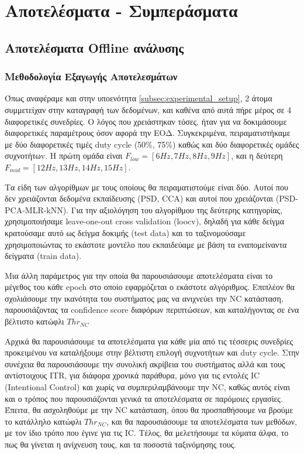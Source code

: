 \documentclass[11pt,a4paper,english,greek,twoside]{../Thesis}
\begin{document}
\chapter{Αποτελέσματα - Συμπεράσματα} \label{chap:Results}

\section{Αποτελέσματα Offline ανάλυσης}

\subsection{Μεθοδολογία Εξαγωγής Αποτελεσμάτων}

\par Όπως αναφέραμε και στην υποενότητα \ref{subsec:experimental_setup}, 2 άτομα συμμετείχαν στην καταγραφή των δεδομένων, και καθένα από αυτά πήρε μέρος σε 4 διαφορετικές συνεδρίες. Ο λόγος που χρειάστηκαν τόσες, ήταν για να δοκιμάσουμε διαφορετικές παραμέτρους όσον αφορά την ΕΟΔ. Συγκεκριμένα, πειραματιστήκαμε με δύο διαφορετικές τιμές duty cycle (50\%, 75\%) καθώς και δύο διαφορετικές ομάδες συχνοτήτωv. Η πρώτη ομάδα είναι $F_{low} = [6Hz,7Hz,8Hz,9Hz]$, και η δεύτερη $F_{mid} = [12Hz,13Hz,14Hz,15Hz]$.

\par Τα είδη των αλγορίθμων με τους οποίους θα πειραματιστούμε είναι δύο. Αυτοί που δεν χρειάζονται δεδομένα εκπαίδευσης (PSD, CCA) και αυτοί που χρειάζονται (PSD-PCA-MLR-kNN). Για την αξιολόγηση του αλγορίθμου της δεύτερης κατηγορίας, χρησιμοποιήσαμε leave-one-out cross validation (loocv), δηλαδή για κάθε δείγμα κρατούσαμε αυτό ως δείγμα δοκιμής (test data) και το ταξινομούσαμε χρησιμοποιώντας το εκάστοτε μοντέλο που εκπαιδεύαμε με βάση τα εναπομείναντα δείγματα (train data).

\par Μια άλλη παράμετρος για την οποία θα παρουσιάσουμε αποτελέσματα είναι το μέγεθος του κάθε epoch στο οποίο εφαρμόζεται ο εκάστοτε αλγόριθμος. Επιπλέον θα σχολιάσουμε την ικανότητα του συστήματος μας να ανιχνεύει την NC κατάσταση, παρουσιάζοντας τα confidence score διαφόρων περιπτώσεων, και καταλήγοντας σε ένα βέλτιστο κατώφλι $Thr_{NC}$

\par Αρχικά θα παρουσιάσουμε τα αποτελέσματα για κάθε μία από τις τέσσερις συνεδρίες προκειμένου να καταλήξουμε στην βέλτιστη επιλογή συχνοτήτων και duty cycle. Στην συνέχεια θα παρουσιάσουμε την συνολική ακρίβεια του συστήματος αλλά και τους αντίστοιχους ITR, για διάφορα χρονικά παράθυρα, μόνο για τις εντολές IC (Intentional Control) και χωρίς να συμπεριλαμβάνουμε την NC, καθώς αυτός είναι και ο τρόπος που παρουσιάζονται γενικά τα αποτελέσματα σε παρόμοιες εργασίες. Έπειτα, θα ασχοληθούμε με την NC κατάσταση, όπου θα προσπαθήσουμε να βρούμε το κατάλληλο κατώφλι $Thr_{NC}$, και θα παρουσιάσουμε τα αποτελέσματα των μεθόδων, με τον ίδιο τρόπο που έγινε για τις IC. Τέλος, θα μελετήσουμε τα κύματα άλφα, το πως θα γίνεται η ανίχνευση τους, και τα ποσοστά ταξινόμησης τους.
\end{document}
